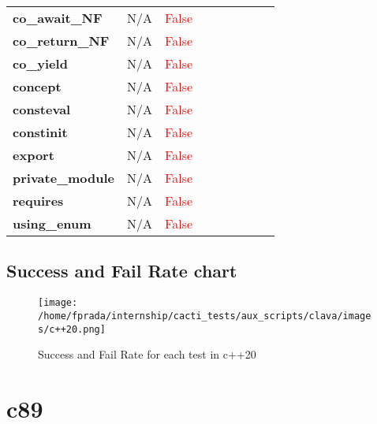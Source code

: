 \documentclass{article}
\begin{document}
\begin{xltabular}{\textwidth}{lcccccccc}
\textbf{{\fontsize{10}{12}\selectfont co\_await\_NF}}& N/A&\textcolor{red}{False} \\[0.5ex]
\textbf{{\fontsize{10}{12}\selectfont co\_return\_NF}}& N/A&\textcolor{red}{False} \\[0.5ex]
\textbf{{\fontsize{10}{12}\selectfont co\_yield}}& N/A&\textcolor{red}{False} \\[0.5ex]
\textbf{{\fontsize{10}{12}\selectfont concept}}& N/A&\textcolor{red}{False} \\[0.5ex]
\textbf{{\fontsize{10}{12}\selectfont consteval}}& N/A&\textcolor{red}{False} \\[0.5ex]
\textbf{{\fontsize{10}{12}\selectfont constinit}}& N/A&\textcolor{red}{False} \\[0.5ex]
\textbf{{\fontsize{10}{12}\selectfont export}}& N/A&\textcolor{red}{False} \\[0.5ex]
\textbf{{\fontsize{10}{12}\selectfont private\_module}}& N/A&\textcolor{red}{False} \\[0.5ex]
\textbf{{\fontsize{10}{12}\selectfont requires}}& N/A&\textcolor{red}{False} \\[0.5ex]
\textbf{{\fontsize{10}{12}\selectfont using\_enum}}& N/A&\textcolor{red}{False} \\[0.5ex]
\bottomrule
\end{xltabular}
\newpage
\subsection{Success and Fail Rate chart}
\begin{figure}[h!]
\centering
\texttt{[image: /home/fprada/internship/cacti\_tests/aux\_scripts/clava/images/c++20.png]}
\caption{Success and Fail Rate for each test in c++20}
\label{fig:c++20}
\end{figure}
\newpage
\section{c89}
\end{document}
